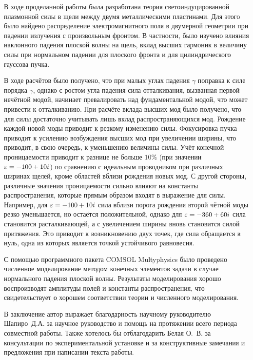 \conclusion
В ходе проделанной работы была разработана теория светоиндуцированной плазмонной силы в щели между двумя металлическими пластинами. Для этого было найдено распределение электромагнитного поля в двумерной геометрии при падении излучения с произвольным фронтом. В частности, было изучено влияния наклонного падения плоской волны на щель, вклад высших гармоник в величину силы при нормальном падении для плоского фронта и для цилиндрического гауссова пучка. 

В ходе расчётов было получено, что при малых углах падения $\gamma$ поправка к силе порядка $\gamma$, однако с ростом угла падения сила отталкивания, вызванная первой нечётной модой, начинает превалировать над фундаментальной модой, что может привести к отталкиванию. При расчёте вклада высших мод было получено, что для силы достаточно учитывать лишь вклад распространяющихся мод. Рождение каждой новой моды приводит к резкому изменению силы. Фокусировка пучка приводит к усилению возбуждения высших мод при увеличении ширины, что приводит, в свою очередь, к уменьшению величины силы. Учёт конечной проницаемости приводит к разнице не больше $10\%$ (при значении $\varepsilon = -100 + 10i$) по сравнению с идеальным проводником при различных ширинах щелей, кроме областей вблизи рождения новых мод. С другой стороны, различные  значения проницаемости сильно влияют на константы распространения, которые прямым образом входят в выражение для силы. Например, для $\varepsilon = -100 + 10 i$ сила вблизи порога рождения второй чётной моды резко уменьшается, но остаётся положительной, однако для $\varepsilon = -360 + 60 i$ сила становится расталкивающей, а с увеличением ширины вновь становится силой притяжения. Это приводит к возникновению двух точек, где сила обращается в нуль, одна из которых является точкой устойчивого равновесия. 

С помощью программного пакета COMSOL Multyphysics было проведено численное моделирование методом конечных элементов задачи в случае нормального падения плоской волны. Результаты моделирования хорошо воспроизводят амплитуды полей и константы распространения, что свидетельствует о хорошем соответствии теории и численного моделирования.

 В заключение автор выражает благодарность научному руководителю Шапиро~Д.\:А. за научное руководство и помощь на протяжении всего периода совместной работы. Также хотелось бы отблагодарить Белая О.~\:В. за консультации по экспериментальной установке и за конструктивные замечания и предложения при написании текста работы.
